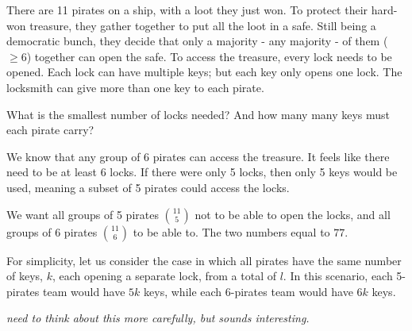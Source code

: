 \begin{qanda} %
    \Q 
    There are 11 pirates on a ship, with a loot they just won.
    To protect their hard-won treasure, they gather together to put all the loot in a safe.
    Still being a democratic bunch, they decide that only a majority - any majority - of them ($\geq 6$) together can open the safe.
    To access the treasure, every lock needs to be opened. 
    Each lock can have multiple keys; but each key only opens one lock. The locksmith can give more than one key to each pirate.

    What is the smallest number of locks needed?
    And how many many keys must each pirate carry?

    \A 
    We know that any group of 6 pirates can access the treasure.
    It feels like there need to be at least 6 locks. 
    If there were only 5 locks, then only 5 keys would be used, meaning a subset of 5 pirates could access the locks.

    We want all groups of 5 pirates $\binom{11}{5}$ not to be able to open the locks, and all groups of 6 pirates $\binom{11}{6}$ to be able to.
    The two numbers equal to $77$.

    For simplicity, let us consider the case in which all pirates have the same number of keys, $k$, each opening a separate lock, from a total of $l$.
    In this scenario, each 5-pirates team would have $5k$ keys, while each 6-pirates team would have $6k$ keys.

    \emph{need to think about this more carefully, but sounds interesting.}
\end{qanda}

